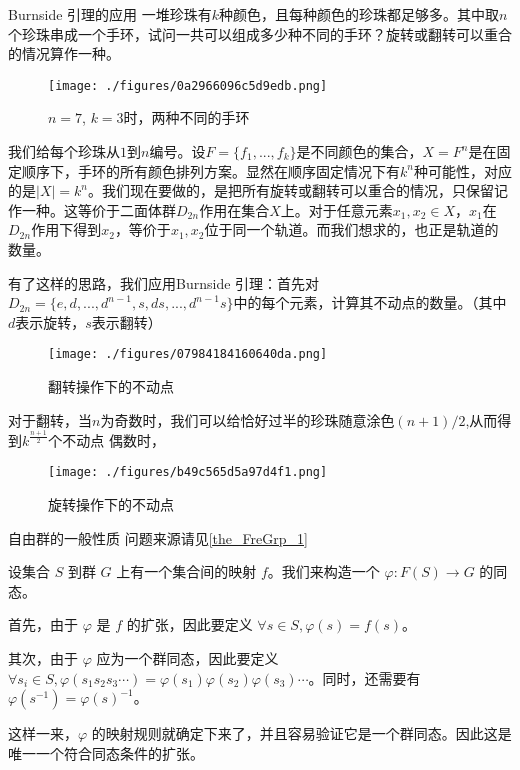 \begin{example}{Burnside 引理的应用}
一堆珍珠有$k$种颜色，且每种颜色的珍珠都足够多。其中取$n$个珍珠串成一个手环，试问一共可以组成多少种不同的手环？旋转或翻转可以重合的情况算作一种。

\begin{figure}[ht]
\centering
\texttt{[image: ./figures/0a2966096c5d9edb.png]}
\caption{$n=7$, $k=3$时，两种不同的手环} \label{fig_GroupP_1}
\end{figure}

我们给每个珍珠从$1$到$n$编号。设$F=\{f_1,...,f_k\}$是不同颜色的集合，$X=F^n$是在固定顺序下，手环的所有颜色排列方案。显然在顺序固定情况下有$k^n$种可能性，对应的是$|X|=k^n$。我们现在要做的，是把所有旋转或翻转可以重合的情况，只保留记作一种。这等价于二面体群$D_{2n}$作用在集合$X$上。对于任意元素$x_1,x_2\in X$，$x_1$在$D_{2n}$作用下得到$x_2$，等价于$x_1,x_2$位于同一个轨道。而我们想求的，也正是轨道的数量。

有了这样的思路，我们应用Burnside 引理：首先对$D_{2n}=\{e,d,...,d^{n-1},s,ds,...,d^{n-1}s\}$中的每个元素，计算其不动点的数量。（其中$d$表示旋转，$s$表示翻转）

\begin{figure}[ht]
\centering
\texttt{[image: ./figures/07984184160640da.png]}
\caption{翻转操作下的不动点} \label{fig_GroupP_2}
\end{figure}

对于翻转，当$n$为奇数时，我们可以给恰好过半的珍珠随意涂色$(n+1)/2$,从而得到$k^\frac{n+1}{2}$个不动点 偶数时，

\begin{figure}[ht]
\centering
\texttt{[image: ./figures/b49c565d5a97d4f1.png]}
\caption{旋转操作下的不动点} \label{fig_GroupP_3}
\end{figure}
\end{example}




\begin{example}{自由群的一般性质}\label{ex_GroupP_4}
问题来源请见\autoref{the_FreGrp_1}~

设集合 $S$ 到群 $G$ 上有一个集合间的映射 $f$。我们来构造一个 $\varphi: F(S)\rightarrow G$ 的同态。

首先，由于 $\varphi$ 是 $f$ 的扩张，因此要定义 $\forall s\in S, \varphi(s)=f(s)$。

其次，由于 $\varphi$ 应为一个群同态，因此要定义 $\forall s_i\in S, \varphi({s_1s_2s_3\cdots})=\varphi(s_1)\varphi(s_2)\varphi(s_3)\cdots$。同时，还需要有 $\varphi(s^{-1})=\varphi(s)^{-1}$。

这样一来，$\varphi$ 的映射规则就确定下来了，并且容易验证它是一个群同态。因此这是唯一一个符合同态条件的扩张。


\end{example}
